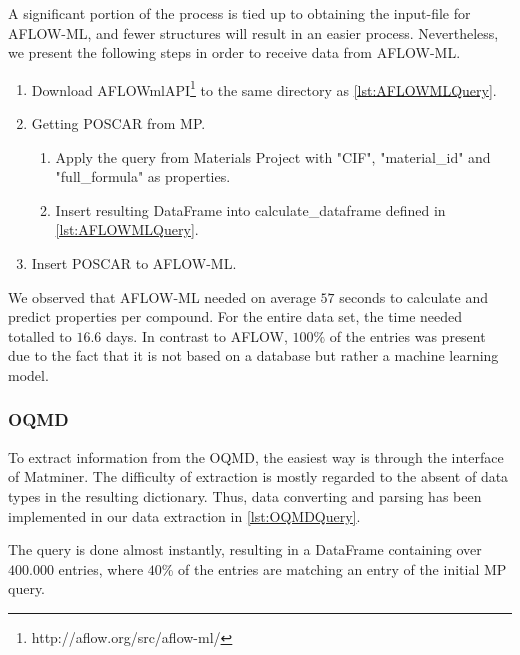 
A significant portion of the process is tied up to obtaining the input-file for AFLOW-ML, and fewer structures will result in an easier process. Nevertheless, we present the following steps in order to receive data from AFLOW-ML.

\begin{enumerate}
  \item Download AFLOWmlAPI\footnote{http://aflow.org/src/aflow-ml/} to the same directory as  \autoref{lst:AFLOWMLQuery}.
  \item Getting POSCAR from MP.
  \begin{enumerate}
    \item Apply the query from Materials Project with "CIF", "material\_id" and "full\_formula" as properties.
    \item Insert resulting DataFrame into calculate\_dataframe defined in \autoref{lst:AFLOWMLQuery}.
  \end{enumerate}
    \item Insert POSCAR to AFLOW-ML.
\end{enumerate}


\noindent We observed that AFLOW-ML needed on average $57$ seconds to calculate and predict properties per compound. For the entire data set, the time needed totalled to $16.6$ days. In contrast to AFLOW, $100\%$ of the entries was present due to the fact that it is not based on a database but rather a machine learning model.

\subsubsection{OQMD}

To extract information from the OQMD, the easiest way is through the interface of Matminer. The difficulty of extraction is mostly regarded to the absent of data types in the resulting dictionary. Thus, data converting and parsing has been implemented in our data extraction in \autoref{lst:OQMDQuery}.

The query is done almost instantly, resulting in a DataFrame containing over $400.000$ entries, where $40$\% of the entries are matching an entry of the initial MP query.



